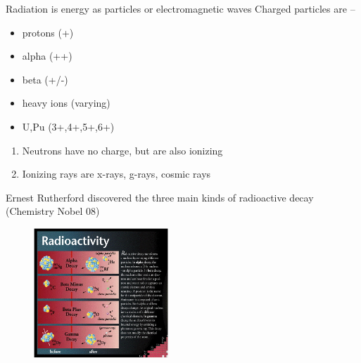 \documentclass[aspectratio=1610,pdftex,dvipsnames,compress,xcolor={dvipsnames}]{beamer}
\begin{document}
\begin{frame}{Radiation is energy as particles or electromagnetic waves}
    Charged particles are --
    \begin{itemize}[series=outerlist,topsep=0pt,itemsep=5pt]
        \item protons (+)
        \item alpha (++)
        \item beta (+/-)
        \item heavy ions (varying)
        \item U,Pu (3+,4+,5+,6+)
    \end{itemize}

    \vspace*{\fill}

    \begin{enumerate}[series=outerlist,topsep=0pt,itemsep=21pt,leftmargin=*,label=(\arabic*)]
        \item[]Neutrons have no charge, but are also ionizing
        \item[]Ionizing rays are x-rays, g-rays, cosmic rays
    \end{enumerate}
\end{frame}


\begin{frame}{Ernest Rutherford discovered the three main kinds of radioactive decay (Chemistry Nobel 08)}
    \begin{figure}
        \centering
        \includegraphics[width=0.45\textwidth]{radioactivity.jpg}
    \end{figure}
\end{frame}
\end{document}
